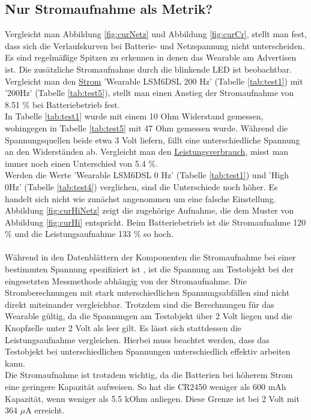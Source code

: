 \subsection{Nur Stromaufnahme als Metrik?}
Vergleicht man Abbildung \ref{fig:curNetz} und Abbildung \ref{fig:curCr}, stellt man fest, dass sich die Verlaufskurven bei Batterie- und Netzspannung nicht unterscheiden.
Es sind regelmäßige Spitzen zu erkennen in denen das Wearable am Advertisen ist.
Die zusätzliche Stromaufnahme durch die blinkende LED ist beobachtbar.\\
Vergleicht man den \underline{Strom} 'Wearable LSM6DSL 200 Hz' (Tabelle \ref{tab:test1}) mit '200Hz' (Tabelle \ref{tab:test5}), stellt man einen Anstieg der Stromaufnahme von 8.51 \% bei Batteriebetrieb fest.\\
In Tabelle \ref{tab:test1} wurde mit einem 10 Ohm Widerstand gemessen, wohingegen in Tabelle \ref{tab:test5} mit 47 Ohm gemessen wurde.
Während die Spannungsquellen beide etwa 3 Volt liefern, fällt eine unterschiedliche Spannung an den Widerständen ab.
Vergleicht man den \underline{Leistungsverbrauch}, misst man immer noch einen Unterschied von 5.4 \%.\\
Werden die Werte 'Wearable LSM6DSL 0 Hz' (Tabelle \ref{tab:test1}) und 'High 0Hz' (Tabelle \ref{tab:test4}) verglichen, sind die Unterschiede noch höher.
Es handelt sich nicht wie zunächst angenommen um eine falsche Einstellung.
Abbildung \ref{fig:curHiNetz} zeigt die zugehörige Aufnahme, die dem Muster von Abbildung \ref{fig:curHi} entspricht.
Beim Batteriebetrieb ist die Stromaufnahme 120 \% und die Leistungsaufnahme 133 \% so hoch.\\\\
Während in den Datenblättern der Komponenten die Stromaufnahme bei einer bestimmten Spannung spezifiziert ist \cite{datasheet_lsm6dsl} \cite{datasheet_nrf52832}, ist die Spannung am Testobjekt bei der eingesetzten Messmethode abhängig von der Stromaufnahme.
Die Stromberechnungen mit stark unterschiedlichen Spannungsabfällen sind nicht direkt miteinander vergleichbar.
Trotzdem sind die Berechnungen für das Wearable gültig, da die Spannungen am Testobjekt über 2 Volt liegen und die Knopfzelle unter 2 Volt als leer gilt.
Es lässt sich stattdessen die Leistungsaufnahme vergleichen.
Hierbei muss beachtet werden, dass das Testobjekt bei unterschiedlichen Spannungen unterschiedlich effektiv arbeiten kann.\\
Die Stromaufnahme ist trotzdem wichtig, da die Batterien bei höherem Strom eine geringere Kapazität aufweisen.
So hat die CR2450 weniger als 600 mAh Kapazität, wenn weniger als 5.5 kOhm anliegen.
Diese Grenze ist bei 2 Volt mit 364 $\mu$A erreicht. \cite{datasheet_ds6450}

